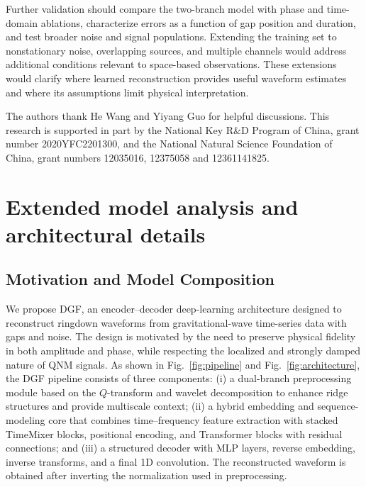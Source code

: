 \documentclass[prd,aps,a4paper,twocolumn,superscriptaddress,nofootinbib,floatfix]{revtex4-2}
\begin{document}
Further validation should compare the two-branch model with phase and time-domain ablations, characterize errors as a function of gap position and duration, and test broader noise and signal populations. Extending the training set to nonstationary noise, overlapping sources, and multiple channels would address additional conditions relevant to space-based observations. These extensions would clarify where learned reconstruction provides useful waveform estimates and where its assumptions limit physical interpretation.

\begin{acknowledgments}
The authors thank He Wang and Yiyang Guo for helpful discussions. This research is supported in part by the National Key R\&D Program of China, grant number 2020YFC2201300, and the National Natural Science Foundation of China, grant numbers 12035016, 12375058 and 12361141825.



\end{acknowledgments}
\label{sec:acknowledgement}






\appendix

\section{Extended model analysis and architectural details}
\label{app:model_analysis}


\subsection{Motivation and Model Composition}
\label{app:motivation}
We propose DGF, an encoder--decoder deep-learning architecture designed to reconstruct ringdown waveforms from gravitational-wave time-series data with gaps and noise. The design is motivated by the need to preserve physical fidelity in both amplitude and phase, while respecting the localized and strongly damped nature of QNM signals. As shown in Fig.~\ref{fig:pipeline} and Fig.~\ref{fig:architecture}, the DGF pipeline consists of three components: (i) a dual-branch preprocessing module based on the $Q$-transform and wavelet decomposition to enhance ridge structures and provide multiscale context; (ii) a hybrid embedding and sequence-modeling core that combines time--frequency feature extraction with stacked TimeMixer blocks, positional encoding, and Transformer blocks with residual connections; and (iii) a structured decoder with MLP layers, reverse embedding, inverse transforms, and a final 1D convolution. The reconstructed waveform is obtained after inverting the normalization used in preprocessing.
\end{document}
